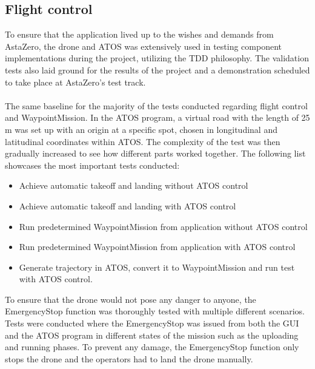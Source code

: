 \subsection{Flight control}
\label{sec:val_flight}
To ensure that the application lived up to the wishes and demands from AstaZero, the drone and ATOS was extensively used in testing component implementations during the project, utilizing the TDD philosophy. The validation tests also laid ground for the results of the project and a demonstration scheduled to take place at AstaZero's test track.
\\ \\
The same baseline for the majority of the tests conducted regarding flight control and WaypointMission. In the ATOS program, a virtual road with the length of 25 m was set up with an origin at a specific spot, chosen in longitudinal and latitudinal coordinates within ATOS. The complexity of the test was then gradually increased to see how different parts worked together. The following list showcases the most important tests conducted:
\\
\begin{itemize}\itemsep0.2em
    \item Achieve automatic takeoff and landing without ATOS control
    \item Achieve automatic takeoff and landing with ATOS control
    \item Run predetermined WaypointMission from application without ATOS control
    \item Run predetermined WaypointMission from application with ATOS control
    \item Generate trajectory in ATOS, convert it to WaypointMission and run test with ATOS control.\\
\end{itemize}

To ensure that the drone would not pose any danger to anyone, the EmergencyStop function was thoroughly tested with multiple different scenarios. Tests were conducted where the EmergencyStop was issued from both the GUI and the ATOS program in different states of the mission such as the uploading and running phases. To prevent any damage, the EmergencyStop function only stops the drone and the operators had to land the drone manually.

